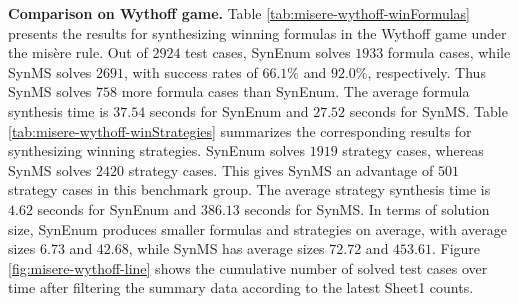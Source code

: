 \textbf{Comparison on Wythoff game.}
Table \ref{tab:misere-wythoff-winFormulas} presents the results for synthesizing winning formulas in the Wythoff game under the mis\`{e}re rule.
Out of $2924$ test cases, SynEnum solves $1933$ formula cases, while SynMS solves $2691$, with success rates of $66.1\%$ and $92.0\%$, respectively.
Thus SynMS solves $758$ more formula cases than SynEnum.
The average formula synthesis time is $37.54$ seconds for SynEnum and $27.52$ seconds for SynMS.
Table \ref{tab:misere-wythoff-winStrategies} summarizes the corresponding results for synthesizing winning strategies.
SynEnum solves $1919$ strategy cases, whereas SynMS solves $2420$ strategy cases.
This gives SynMS an advantage of $501$ strategy cases in this benchmark group.
The average strategy synthesis time is $4.62$ seconds for SynEnum and $386.13$ seconds for SynMS.
In terms of solution size, SynEnum produces smaller formulas and strategies on average, with average sizes $6.73$ and $42.68$, while SynMS has average sizes $72.72$ and $453.61$.
Figure \ref{fig:misere-wythoff-line} shows the cumulative number of solved test cases over time after filtering the summary data according to the latest Sheet1 counts.

